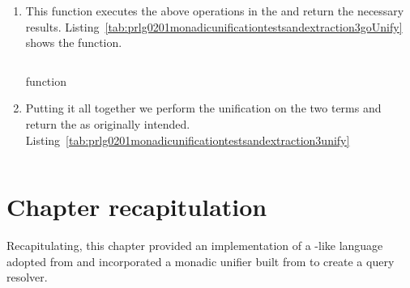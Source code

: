\documentclass[thesis-solanki.tex]{subfiles}
\begin{document}
\begin{enumerate}
\item{}

This function executes the above operations in the  and return the necessary results.
Listing~\ref{tab:prlg0201monadicunificationtestsandextraction3goUnify} shows the  function.

\begin{code-list}[H]
  \begin{singlespace}
    \inputminted[linenos,firstline=95, lastline=107]{haskell}{haskell-proto2-monadic-unification-tests-and-extraction.hs}
  \end{singlespace}
\caption{ function}
\label{tab:prlg0201monadicunificationtestsandextraction3goUnify}
\end{code-list}

\item{}

Putting it all together we perform the unification on the two terms and return the  as originally intended.
Listing~\ref{tab:prlg0201monadicunificationtestsandextraction3unify}

\begin{code-list}[H]
  \begin{singlespace}
    \inputminted[linenos,firstline=121, lastline=131]{haskell}{haskell-proto2-monadic-unification-tests-and-extraction.hs}
  \end{singlespace}
\caption{}
\label{tab:prlg0201monadicunificationtestsandextraction3unify}
\end{code-list}


\end{enumerate}



\section{Chapter recapitulation}
Recapitulating, this chapter provided an implementation of a -like language adopted from
\cite{prolog-lib} and incorporated a monadic unifier built from \cite{unification-fd-lib} to create a
 query resolver.

\ifMain\ifDraft
\begin{scope}
  \nolinenumbers
  \enotesize
  \par
  \begin{singlespace}
  \setlength{\parskip}{12pt plus 2pt minus 1pt}
  \theendnotes
  \par
  \end{singlespace}
\end{scope}
\fi\fi
\end{document}

